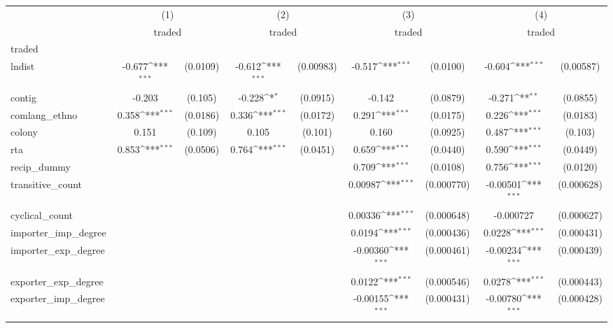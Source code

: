{
\def\sym#1{\ifmmode^{#1}\else\(^{#1}\)\fi}
\begin{tabular}{l*{4}{cc}}
\hline\hline
          &\multicolumn{2}{c}{(1)}     &\multicolumn{2}{c}{(2)}     &\multicolumn{2}{c}{(3)}     &\multicolumn{2}{c}{(4)}     \\
          &\multicolumn{2}{c}{traded}  &\multicolumn{2}{c}{traded}  &\multicolumn{2}{c}{traded}  &\multicolumn{2}{c}{traded}  \\
\hline
traded    &                  &         &                  &         &                  &         &                  &         \\
lndist    &   -0.677\sym{***}& (0.0109)&   -0.612\sym{***}&(0.00983)&   -0.517\sym{***}& (0.0100)&   -0.604\sym{***}&(0.00587)\\
contig    &   -0.203         &  (0.105)&   -0.228\sym{*}  & (0.0915)&   -0.142         & (0.0879)&   -0.271\sym{**} & (0.0855)\\
comlang\_ethno&    0.358\sym{***}& (0.0186)&    0.336\sym{***}& (0.0172)&    0.291\sym{***}& (0.0175)&    0.226\sym{***}& (0.0183)\\
colony    &    0.151         &  (0.109)&    0.105         &  (0.101)&    0.160         & (0.0925)&    0.487\sym{***}&  (0.103)\\
rta       &    0.853\sym{***}& (0.0506)&    0.764\sym{***}& (0.0451)&    0.659\sym{***}& (0.0440)&    0.590\sym{***}& (0.0449)\\
recip\_dummy&                  &         &                  &         &    0.709\sym{***}& (0.0108)&    0.756\sym{***}& (0.0120)\\
transitive\_count&                  &         &                  &         &  0.00987\sym{***}&(0.000770)& -0.00501\sym{***}&(0.000628)\\
cyclical\_count&                  &         &                  &         &  0.00336\sym{***}&(0.000648)&-0.000727         &(0.000627)\\
importer\_imp\_degree&                  &         &                  &         &   0.0194\sym{***}&(0.000436)&   0.0228\sym{***}&(0.000431)\\
importer\_exp\_degree&                  &         &                  &         & -0.00360\sym{***}&(0.000461)& -0.00234\sym{***}&(0.000439)\\
exporter\_exp\_degree&                  &         &                  &         &   0.0122\sym{***}&(0.000546)&   0.0278\sym{***}&(0.000443)\\
exporter\_imp\_degree&                  &         &                  &         & -0.00155\sym{***}&(0.000431)& -0.00780\sym{***}&(0.000428)\\

\end{tabular}}
